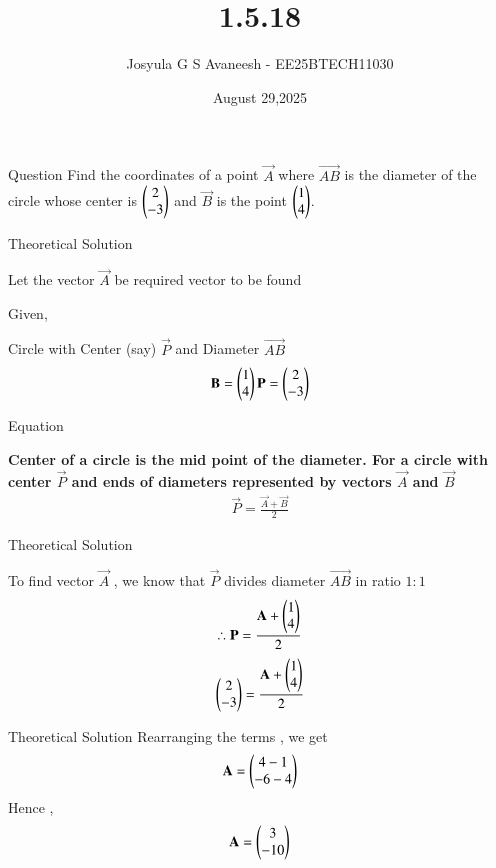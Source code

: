 \documentclass{beamer}
\title %
{1.5.18}
\date{August 29,2025}
\author 
{Josyula G S Avaneesh - EE25BTECH11030}
\begin{document}
\frame{\titlepage}
\begin{frame}{Question}
Find the coordinates of a point $\vec{A}$ where $\vec{AB}$ is the diameter of the circle whose center is $\myvec{2\\-3 }$ and $\vec{B}$ is the point $\myvec{1\\4}$.
\end{frame}



\begin{frame}{Theoretical Solution}

Let the vector $\vec{A}$  be required vector to be found

Given,

Circle with Center (say) $\vec{P}$ and
Diameter $\vec{AB}$ 
\begin{align}
    \vec{B}=\myvec{1\\4} \vec{P} = \myvec{2\\-3}
\end{align}

\end{frame}

\begin{frame}{Equation}

\textbf{Center of a circle is the mid point of the diameter. For a circle with center $\vec{P}$ and ends of diameters represented by vectors $\vec{A}$ and $\vec{B}$  }
\begin{align}
    \vec{P}=\frac{\vec{A}+\vec{B}}{2}
\end{align}

\end{frame}

\begin{frame}{Theoretical Solution}

To find vector $\vec{A}$ , we know that $\vec{P}$ divides diameter $\vec{AB}$ in ratio $1\colon1$
\begin{align}
    \therefore \vec{P} = \frac{\vec{A} + \myvec{1\\4}  }{2} 
\end{align}
\begin{align}
    \myvec{2\\-3} = \frac{\vec{A} + \myvec{1\\4}}{2}    
\end{align}

\end{frame}

\begin{frame}{Theoretical Solution}
Rearranging the terms , we get  
\begin{align}
    \vec{A} = \myvec{4-1\\-6-4} 
\end{align}
Hence , 
\begin{align}
    \vec{A} = \myvec{3\\-10}
\end{align}

\end{frame}
\end{document}

